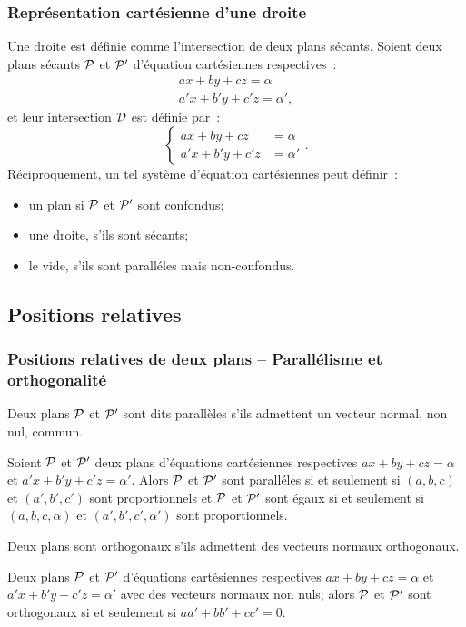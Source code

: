 \subsubsection{Représentation cartésienne d'une droite}

Une droite est définie comme l'intersection de deux plans sécants. Soient deux plans sécants \(\P\) et \(\P'\) d'équation cartésiennes respectives~:
\begin{align}
  ax+by+cz=\alpha \\ a'x+b'y+c'z=\alpha',
\end{align}
et leur intersection \(\Dr\) est définie par~:
\begin{equation}
 \begin{cases} ax+by+cz&=\alpha \\ a'x+b'y+c'z&=\alpha'\end{cases}.
\end{equation}
Réciproquement, un tel système d'équation cartésiennes peut définir~:
\begin{itemize}
\item un plan si \(\P\) et \(\P'\) sont confondus;
\item une droite, s'ils sont sécants;
\item le vide, s'ils sont paralléles mais non-confondus.
\end{itemize}

\subsection{Positions relatives}

\subsubsection{Positions relatives de deux plans -- Parallélisme et orthogonalité}

\begin{defdef}
  Deux plans \(\P\) et \(\P'\) sont dits parallèles s'ils admettent un vecteur normal, non nul, commun.
\end{defdef}
\begin{prop}
  Soient \(\P\) et \(\P'\) deux plans d'équations cartésiennes respectives \(ax+by+cz=\alpha\) et \(a'x+b'y+c'z=\alpha'\). Alors \(\P\) et \(\P'\) sont paralléles si et seulement si \((a,b,c)\) et \((a',b',c')\) sont proportionnels et \(\P\) et \(\P'\) sont égaux si et seulement si \((a,b,c,\alpha)\) et \((a',b',c',\alpha')\) sont proportionnels.
\end{prop}
\begin{defdef}
  Deux plans sont orthogonaux s'ils admettent des vecteurs normaux orthogonaux.
\end{defdef}
\begin{prop}
  Deux plans \(\P\) et \(\P'\) d'équations cartésiennes respectives \(ax+by+cz=\alpha\) et \(a'x+b'y+c'z=\alpha'\) avec des vecteurs normaux non nuls; alors \(\P\) et \(\P'\) sont orthogonaux si et seulement si \(aa'+bb'+cc'=0\).
\end{prop}

